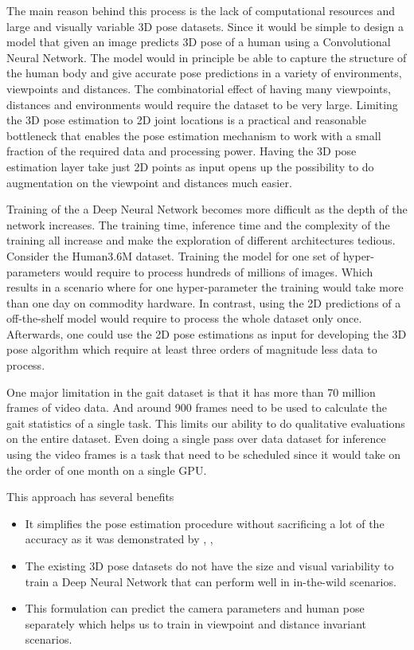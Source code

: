 The main reason behind this process is the lack of computational resources and large and visually variable 3D pose datasets. Since it would be simple to design a model that given an image predicts 3D pose of a human using a Convolutional Neural Network. The model would in principle be able to capture the structure of the human body and give accurate pose predictions in a variety of environments, viewpoints and distances. The combinatorial effect of having many viewpoints, distances and environments would require the dataset to be very large. Limiting the 3D pose estimation to 2D joint locations is a practical and reasonable bottleneck that enables the pose estimation mechanism to work with a small fraction of the required data and processing power. Having the 3D pose estimation layer take just 2D points as input opens up the possibility to do augmentation on the viewpoint and distances much easier. 

Training of the a Deep Neural Network becomes more difficult as the depth of the network increases. The training time, inference time and the complexity of the training all increase and make the exploration of different architectures tedious. 
Consider the Human3.6M dataset. Training the model for one set of hyper-parameters would require to process hundreds of millions of images. Which results in a scenario where for one hyper-parameter the training would take more than one day on commodity hardware. In contrast, using the 2D predictions of a off-the-shelf model would require to process the whole dataset only once. Afterwards, one could use the 2D pose estimations as input for developing the 3D pose algorithm which require at least three orders of magnitude less data to process.

One major limitation in the gait dataset is that it has more than 70 million frames of video data. And around 900 frames need to be used to calculate the gait statistics of a single task. This limits our ability to do qualitative evaluations on the entire dataset. Even doing a single pass over data dataset for inference using the video frames is a task that need to be scheduled since it would take on the order of one month on a single GPU. 

This approach has several benefits
\begin{itemize}
    \item It simplifies the pose estimation procedure without sacrificing a lot of the accuracy as it was demonstrated by \parencite{martinez2017simple}, \parencite{sun2017compositional}, \parencite{hossain2017exploiting}
    \item The existing 3D pose datasets do not have the size and visual variability to train a Deep Neural Network that can perform well in in-the-wild scenarios.
    \item This formulation can predict the camera parameters and human pose separately which helps us to train in viewpoint and distance invariant scenarios.
\end{itemize}

